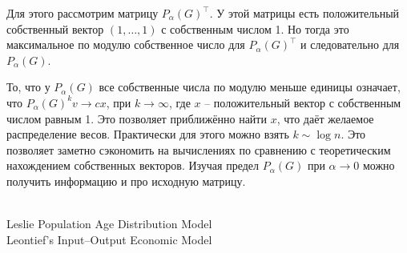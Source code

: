\documentclass[10pt,a4paper,oneside]{book}
\theoremstyle{definition}
\def\exm{\noindent {\bf Примеры:}}
\begin{document}
Для этого рассмотрим матрицу $P_{\alpha}(G)^{\top}$. У этой матрицы есть положительный собственный вектор $(1,\dots,1)$ с собственным числом 1. Но тогда это максимальное по модулю собственное число для $P_{\alpha}(G)^{\top}$ и следовательно для $P_{\alpha}(G)$. 

То, что у $P_{\alpha}(G)$ все собственные числа по модулю меньше единицы означает, что $P_{\alpha}(G)^kv \to cx$, при $k \to \infty$, где $x$ -- положительный вектор с собственным числом равным 1. Это позволяет приближённо найти $x$, что даёт желаемое распределение весов. Практически для этого можно взять $k\sim \log n$. Это позволяет заметно сэкономить на вычислениях по сравнению с теоретическим нахождением собственных векторов. Изучая предел $P_{\alpha}(G)$ при $\alpha \to 0$ можно получить информацию и про исходную матрицу.

\exm\\
Leslie Population Age Distribution Model\\
Leontief’s Input–Output Economic Model




\end{document}
